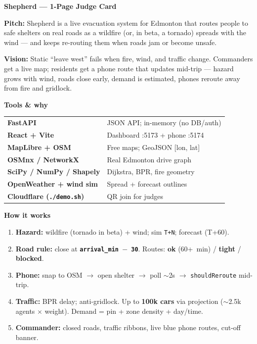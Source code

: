 \documentclass[9pt]{extarticle}
\begin{document}
{\LARGE\bfseries Shepherd --- 1-Page Judge Card\par}
\vspace{2pt}

{\bfseries Pitch:} Shepherd is a live evacuation system for Edmonton that routes people to safe shelters on real roads as a wildfire (or, in beta, a tornado) spreads with the wind --- and keeps re-routing them when roads jam or become unsafe.

{\bfseries Vision:} Static ``leave west'' fails when fire, wind, and traffic change. Commanders get a live map; residents get a phone route that updates mid-trip --- hazard grows with wind, roads close early, demand is estimated, phones reroute away from fire and gridlock.

\noindent
\begin{minipage}[t]{0.48\textwidth}
{\bfseries\large Tools \& why}\\[2pt]
\begin{tabular}{@{}ll@{}}
\textbf{FastAPI} & JSON API; in-memory (no DB/auth) \\
\textbf{React + Vite} & Dashboard :5173 + phone :5174 \\
\textbf{MapLibre + OSM} & Free maps; GeoJSON [lon, lat] \\
\textbf{OSMnx / NetworkX} & Real Edmonton drive graph \\
\textbf{SciPy / NumPy / Shapely} & Dijkstra, BPR, fire geometry \\
\textbf{OpenWeather + wind sim} & Spread + forecast outlines \\
\textbf{Cloudflare (\texttt{./demo.sh})} & QR join for judges \\
\end{tabular}
\end{minipage}
\hfill
\begin{minipage}[t]{0.50\textwidth}
{\bfseries\large How it works}\\[2pt]
\begin{enumerate}
\item \textbf{Hazard:} wildfire (tornado in beta) + wind; sim \texttt{T+N}; forecast (T+60).
\item \textbf{Road rule:} close at \textbf{\texttt{arrival\_min $-$ 30}}. Routes: \textbf{ok} (60+~min) / \textbf{tight} / \textbf{blocked}.
\item \textbf{Phone:} snap to OSM $\to$ open shelter $\to$ poll $\sim$2s $\to$ \texttt{shouldReroute} mid-trip.
\item \textbf{Traffic:} BPR delay; anti-gridlock. Up to \textbf{100k cars} via projection ($\sim$2.5k agents $\times$ weight). Demand = pin + zone density + day/time.
\item \textbf{Commander:} closed roads, traffic ribbons, live blue phone routes, cut-off banner.
\end{enumerate}
\end{minipage}
\end{document}
